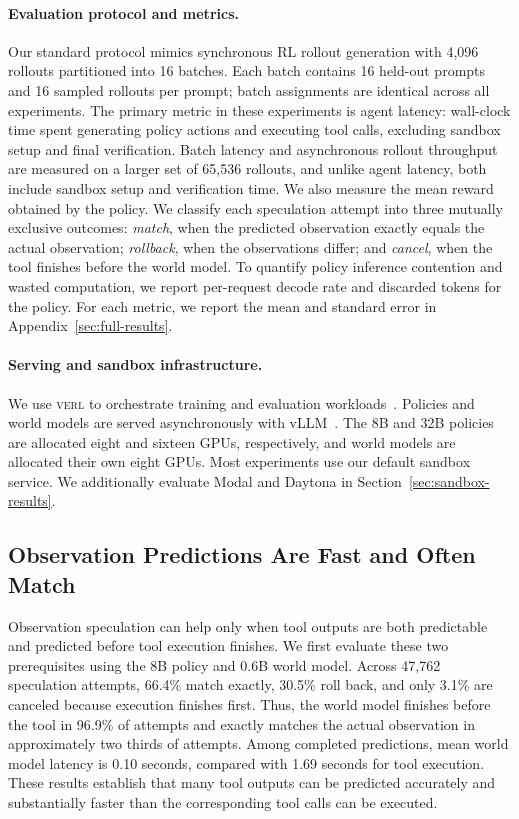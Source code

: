\documentclass{article} %
\begin{document}
\paragraph{Evaluation protocol and metrics.}
Our standard protocol mimics synchronous RL rollout generation with 4,096 rollouts partitioned into 16 batches. Each batch contains 16 held-out prompts and 16 sampled rollouts per prompt; batch assignments are identical across all experiments. The primary metric in these experiments is agent latency: wall-clock time spent generating policy actions and executing tool calls, excluding sandbox setup and final verification. Batch latency and asynchronous rollout throughput are measured on a larger set of 65,536 rollouts, and unlike agent latency, both include sandbox setup and verification time. We also measure the mean reward obtained by the policy. We classify each speculation attempt into three mutually exclusive outcomes: \emph{match}, when the predicted observation exactly equals the actual observation; \emph{rollback}, when the observations differ; and \emph{cancel}, when the tool finishes before the world model. To quantify policy inference contention and wasted computation, we report per-request decode rate and discarded tokens for the policy. For each metric, we report the mean and standard error in Appendix~\ref{sec:full-results}.

\paragraph{Serving and sandbox infrastructure.}
We use \textsc{verl} to orchestrate training and evaluation workloads~\citep{sheng2025hybridflow}. Policies and world models are served asynchronously with vLLM~\citep{kwon2023efficient}. The 8B and 32B policies are allocated eight and sixteen GPUs, respectively, and world models are allocated their own eight GPUs. Most experiments use our default sandbox service. We additionally evaluate Modal and Daytona in Section~\ref{sec:sandbox-results}.

\subsection{Observation Predictions Are Fast and Often Match}
\label{sec:command-predictability}

Observation speculation can help only when tool outputs are both predictable and predicted before tool execution finishes. We first evaluate these two prerequisites using the 8B policy and 0.6B world model. Across 47,762 speculation attempts, 66.4\% match exactly, 30.5\% roll back, and only 3.1\% are canceled because execution finishes first. Thus, the world model finishes before the tool in 96.9\% of attempts and exactly matches the actual observation in approximately two thirds of attempts. Among completed predictions, mean world model latency is 0.10 seconds, compared with 1.69 seconds for tool execution. These results establish that many tool outputs can be predicted accurately and substantially faster than the corresponding tool calls can be executed.
\end{document}
